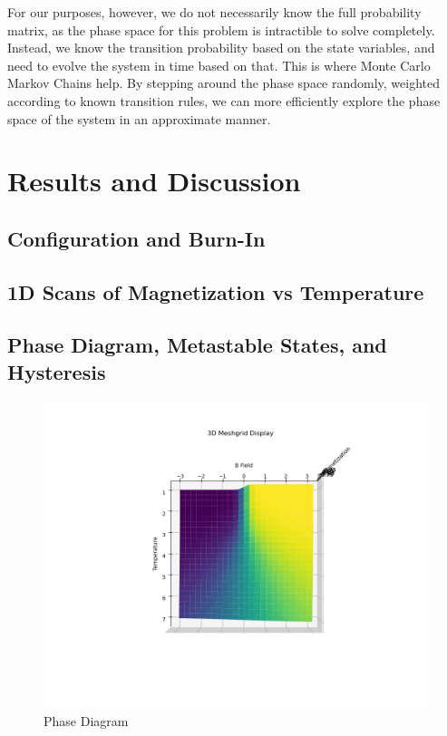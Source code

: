 \documentclass[%
 reprint,
 amsmath,amssymb,
 aps,
]{revtex4-2}
\begin{document}
For our purposes, however, we do not necessarily know the full probability matrix, as the phase space for this problem is intractible to solve completely. Instead, we know the transition probability based on the state variables, and need to evolve the system in time based on that. This is where Monte Carlo Markov Chains help. By stepping around the phase space randomly, weighted according to known transition rules, we can more efficiently explore the phase space of the system in an approximate manner.

\section{\label{sec:level1}Results and Discussion}
\subsection{\label{sec:level2}Configuration and Burn-In}
\subsection{\label{sec:level2}1D Scans of Magnetization vs Temperature}
\subsection{\label{sec:level2}Phase Diagram, Metastable States, and Hysteresis}
\begin{figure}
    \centering
    \includegraphics[width=1\linewidth]{graph_0.png}
    \caption{Phase Diagram}
    \label{fig:enter-label}
\end{figure}
\end{document}
